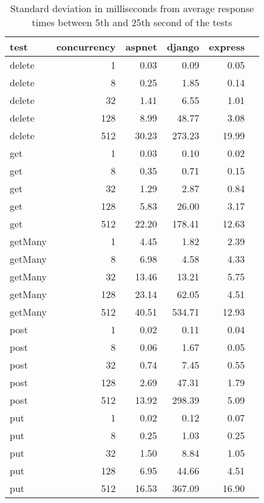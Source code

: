 \FloatBarrier
\begin{table}[!htp]\centering
    \caption{Standard deviation in milliseconds from average response times between 5th and 25th second of the tests}\label{tab:stdev}
    \scriptsize
    \begin{tabular}{lrrrrr}\toprule
        test    & concurrency & aspnet & django & express \\\midrule
        delete  & 1           & 0.03   & 0.09   & 0.05    \\
        delete  & 8           & 0.25   & 1.85   & 0.14    \\
        delete  & 32          & 1.41   & 6.55   & 1.01    \\
        delete  & 128         & 8.99   & 48.77  & 3.08    \\
        delete  & 512         & 30.23  & 273.23 & 19.99   \\
        get     & 1           & 0.03   & 0.10   & 0.02    \\
        get     & 8           & 0.35   & 0.71   & 0.15    \\
        get     & 32          & 1.29   & 2.87   & 0.84    \\
        get     & 128         & 5.83   & 26.00  & 3.17    \\
        get     & 512         & 22.20  & 178.41 & 12.63   \\
        getMany & 1           & 4.45   & 1.82   & 2.39    \\
        getMany & 8           & 6.98   & 4.58   & 4.33    \\
        getMany & 32          & 13.46  & 13.21  & 5.75    \\
        getMany & 128         & 23.14  & 62.05  & 4.51    \\
        getMany & 512         & 40.51  & 534.71 & 12.93   \\
        post    & 1           & 0.02   & 0.11   & 0.04    \\
        post    & 8           & 0.06   & 1.67   & 0.05    \\
        post    & 32          & 0.74   & 7.45   & 0.55    \\
        post    & 128         & 2.69   & 47.31  & 1.79    \\
        post    & 512         & 13.92  & 298.39 & 5.09    \\
        put     & 1           & 0.02   & 0.12   & 0.07    \\
        put     & 8           & 0.25   & 1.03   & 0.25    \\
        put     & 32          & 1.50   & 8.84   & 1.05    \\
        put     & 128         & 6.95   & 44.66  & 4.51    \\
        put     & 512         & 16.53  & 367.09 & 16.90   \\
        \bottomrule
    \end{tabular}
\end{table}
\FloatBarrier
